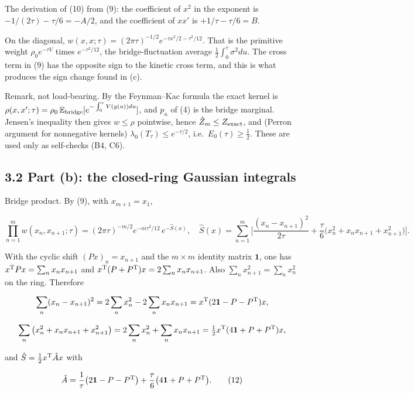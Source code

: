 \documentclass[11pt,a4paper]{article}
\newcommand{\tagmark}[1]{\marginnote{\scriptsize\ttfamily #1}}
\newcommand{\Dtag}{\tagmark{[D]}}   %
\newcommand{\Rtag}{\tagmark{[R]}}   %
\begin{document}
The derivation of (10) from (9): the coefficient of \(x^2\) in the
exponent is \(-1/(2\tau) - \tau/6 = -A/2\), and the coefficient of
\(xx'\) is \(+1/\tau - \tau/6 = B\).

On the diagonal,
\(w(x,x;\tau) = (2\pi\tau)^{-1/2}e^{-\tau x^2/2 - \tau^2/12}\). That is
the primitive weight \(\rho_0 e^{-\tau V}\) times \(e^{-\tau^2/12}\),
the bridge-fluctuation average \(\tfrac12\int_0^\tau\sigma^2du\). The
cross term in (9) has the opposite sign to the kinetic cross term, and
this is what produces the sign change found in (c).

Remark, not load-bearing. \Rtag{} By the Feynman--Kac formula the exact
kernel is
\(\rho(x,x';\tau) = \rho_0\,\mathbb E_{\rm bridge}[e^{-\int_0^\tau V(y(u))du}]\),
and \(p_u\) of (4) is the bridge marginal. Jensen's inequality then
gives \(w \le \rho\) pointwise, hence \(\hat Z_m \le Z_{\rm exact}\),
and (Perron argument for nonnegative kernels)
\(\lambda_0(T_\tau) \le e^{-\tau/2}\), i.e.~\(E_0(\tau)\ge\tfrac12\).
These are used only as self-checks (B4, C6).

\hypertarget{part-b-the-closed-ring-gaussian-integrals}{%
\subsection{3.2 Part (b): the closed-ring Gaussian
integrals}\label{part-b-the-closed-ring-gaussian-integrals}}

Bridge product. By (9), with \(x_{m+1}=x_1\),

\[
\prod_{n=1}^m w(x_n,x_{n+1};\tau) = (2\pi\tau)^{-m/2}e^{-m\tau^2/12}\,e^{-\hat S(x)},\quad
\hat S(x) = \sum_{n=1}^m\Big[\frac{(x_n-x_{n+1})^2}{2\tau} + \frac\tau6\big(x_n^2 + x_nx_{n+1} + x_{n+1}^2\big)\Big]. \tag{11}
\]

\Dtag{} With the cyclic shift \((Px)_n = x_{n+1}\) and the \(m\times m\)
identity matrix \(\mathbf 1\), one has
\(x^{\rm T}Px = \sum_n x_nx_{n+1}\) and
\(x^{\rm T}(P+P^{\rm T})x = 2\sum_nx_nx_{n+1}\). Also
\(\sum_n x_{n+1}^2 = \sum_n x_n^2\) on the ring. Therefore

\[
\sum_n(x_n-x_{n+1})^2 = 2\sum_nx_n^2 - 2\sum_nx_nx_{n+1} = x^{\rm T}(2\mathbf 1 - P - P^{\rm T})x,
\]

\[
\sum_n\big(x_n^2+x_nx_{n+1}+x_{n+1}^2\big) = 2\sum_nx_n^2 + \sum_nx_nx_{n+1} = \tfrac12x^{\rm T}(4\mathbf 1 + P + P^{\rm T})x,
\]

and \(\hat S = \tfrac12x^{\rm T}\hat Ax\) with

\[
\hat A = \frac1\tau\big(2\mathbf 1 - P - P^{\rm T}\big) + \frac\tau6\big(4\mathbf 1 + P + P^{\rm T}\big). \tag{12}
\]
\end{document}
